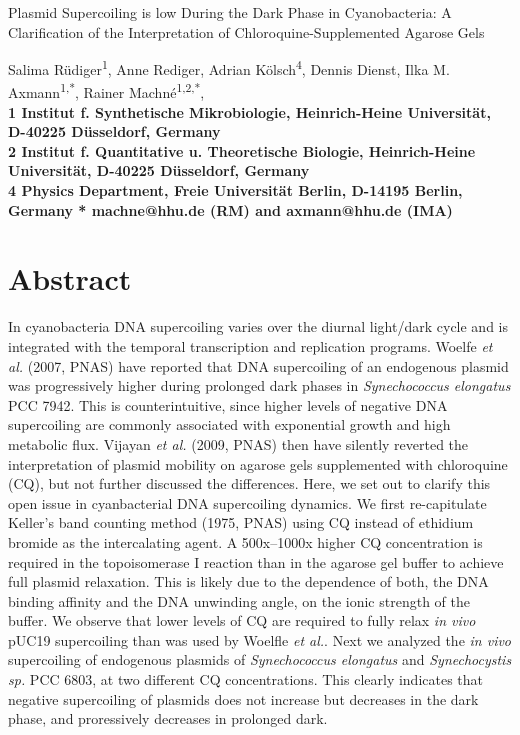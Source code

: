 \documentclass[10pt,letterpaper]{article}
\begin{document}
\vspace*{0.35in}

\begin{flushleft}
{\Large Plasmid Supercoiling is low During the Dark Phase in
  Cyanobacteria: A Clarification of the Interpretation of
  Chloroquine-Supplemented Agarose Gels}

Salima R\"udiger\textsuperscript{1}, 
Anne Rediger, Adrian K\"olsch\textsuperscript{4}, Dennis Dienst,
Ilka M. Axmann\textsuperscript{1,*},
Rainer Machn\'e\textsuperscript{1,2,*},
\\
\bigskip
\bf{1} Institut f. Synthetische Mikrobiologie, Heinrich-Heine Universit\"at, D-40225 D\"usseldorf, Germany
\\
\bf{2} Institut f. Quantitative u. Theoretische Biologie, Heinrich-Heine Universit\"at, D-40225 D\"usseldorf, Germany
\\
\bf{4} Physics Department, Freie Universität Berlin, D-14195 Berlin, Germany
\bigskip
* machne@hhu.de (RM) and axmann@hhu.de (IMA)

\end{flushleft}

\section*{Abstract}
In cyanobacteria DNA supercoiling varies over the diurnal light/dark
cycle and is integrated with the temporal transcription and
replication programs. Woelfe \textit{et al.} (2007, PNAS) have
reported that DNA supercoiling of an endogenous plasmid was
progressively higher during prolonged dark phases in
\textit{Synechococcus elongatus} PCC 7942.  This is counterintuitive,
since higher levels of negative DNA supercoiling are commonly
associated with exponential growth and high metabolic flux. Vijayan
\textit{et al.} (2009, PNAS) then have silently reverted the
interpretation of plasmid mobility on agarose gels supplemented with
chloroquine (CQ), but not further discussed the differences.
%
Here, we set out to clarify this open issue in cyanbacterial DNA
supercoiling dynamics. We first re-capitulate Keller's band counting
method (1975, PNAS) using CQ instead of ethidium bromide as the
intercalating agent.  A 500x--1000x higher CQ concentration is
required in the topoisomerase I reaction than in the agarose gel
buffer to achieve full plasmid relaxation. This is likely due to the
dependence of both, the DNA binding affinity and the DNA unwinding
angle, on the ionic strength of the buffer. We observe that lower
levels of CQ are required to fully relax \textit{in vivo} pUC19
supercoiling than was used by Woelfle \textit{et al.}. Next we
analyzed the \textit{in vivo} supercoiling of endogenous plasmids of
\textit{Synechococcus elongatus} and \textit{Synechocystis sp.} PCC
6803, at two different CQ concentrations.  This clearly indicates that
negative supercoiling of plasmids does not increase but decreases in
the dark phase, and proressively decreases in prolonged dark.
\end{document}

